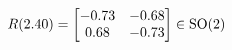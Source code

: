 \documentclass[preview]{standalone}
\begin{document}
\begin{align*}
\special{dvisvgm:raw <g id='unique000'>}R(2.40) = \begin{bmatrix} -0.73 & -0.68 \\ 0.68 & -0.73 \end{bmatrix} \in \text{SO}(2)\special{dvisvgm:raw </g>}
\end{align*}
\end{document}
